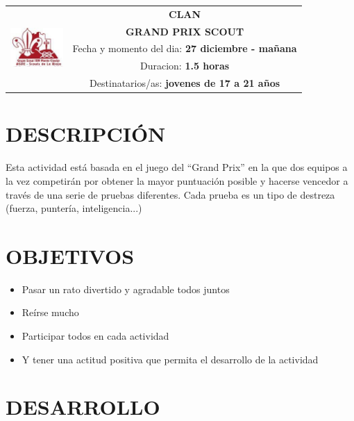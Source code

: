 \documentclass[72pt]{article}
\newlength{\w}
\begin{document}
\large
{}\selectfont
\begin{tabular}{|p{2cm}|c|}
\hline
\multirow{5}{*}{\includegraphics[width=2cm]{logo}} & \textbf{CLAN} \\ %
\cline{2-2}
& \textbf{GRAND PRIX SCOUT} \\ %
\cline{2-2}
& \parbox{\textwidth-4cm}{Fecha y momento del dia: \textbf{27 diciembre - mañana}} \\ %
& \parbox{\textwidth-4cm}{Duracion: \textbf{1.5 horas}} \\ %
& \parbox{\textwidth-4cm}{Destinatarios/as: \textbf{jovenes de 17 a 21 años}} \\ %
\hline
\end{tabular}

\section*{DESCRIPCI\'ON}
Esta actividad está basada en el juego del “Grand Prix” en la que dos
equipos a la vez competirán por obtener la mayor puntuación posible y
hacerse vencedor a través de una serie de pruebas diferentes. Cada
prueba es un tipo de destreza (fuerza, puntería, inteligencia...)
\section*{OBJETIVOS}
\begin{itemize}
    \item Pasar un rato divertido y agradable todos juntos
	\item Reírse mucho
	\item Participar todos en cada actividad
	\item Y tener una actitud positiva que permita el desarrollo de la actividad
\end{itemize}

\section*{DESARROLLO}
\end{document}
